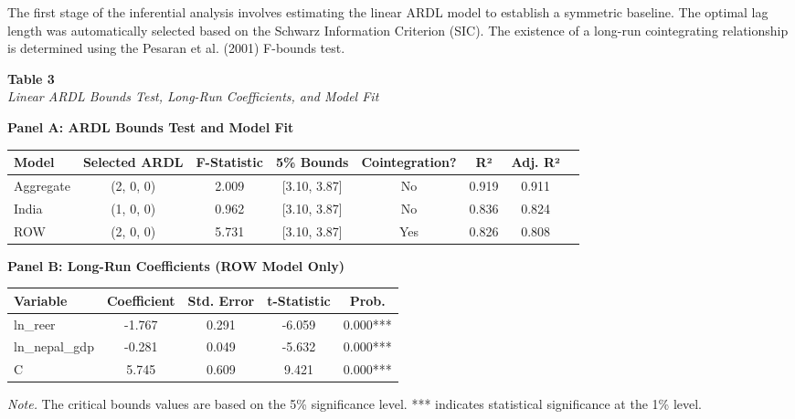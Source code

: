 \documentclass[12pt]{article}
\begin{document}
The first stage of the inferential analysis involves estimating the linear ARDL model to establish a symmetric baseline. The optimal lag length was automatically selected based on the Schwarz Information Criterion (SIC). The existence of a long-run cointegrating relationship is determined using the Pesaran et al. (2001) F-bounds test.

\begin{table}[htbp]
\raggedright

\textbf{Table 3}\\
\textit{Linear ARDL Bounds Test, Long-Run Coefficients, and Model Fit}

\vspace{0.3cm}

\renewcommand{\arraystretch}{1.4}
\setlength{\tabcolsep}{8pt}

\textbf{Panel A: ARDL Bounds Test and Model Fit}

\begin{tabular}{lccccccc}
\hline
Model & Selected ARDL & F-Statistic & 5\% Bounds & Cointegration? & R² & Adj. R² \\
\hline
Aggregate & (2, 0, 0) & 2.009 & [3.10, 3.87] & No  & 0.919 & 0.911 \\
India     & (1, 0, 0) & 0.962 & [3.10, 3.87] & No  & 0.836 & 0.824 \\
ROW       & (2, 0, 0) & 5.731 & [3.10, 3.87] & Yes & 0.826 & 0.808 \\
\hline
\end{tabular}

\vspace{0.5cm}

\textbf{Panel B: Long-Run Coefficients (ROW Model Only)}

\begin{tabular}{lcccc}
\hline
Variable & Coefficient & Std. Error & t-Statistic & Prob. \\
\hline
ln\_reer & -1.767 & 0.291 & -6.059 & 0.000*** \\
ln\_nepal\_gdp & -0.281 & 0.049 & -5.632 & 0.000*** \\
C & 5.745 & 0.609 & 9.421 & 0.000*** \\
\hline
\end{tabular}

\vspace{0.3cm}

\footnotesize
\textit{Note.} The critical bounds values are based on the 5\% significance level. 
*** indicates statistical significance at the 1\% level. 

\end{table}
\end{document}
